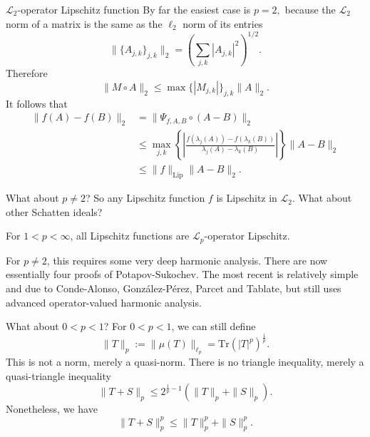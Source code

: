 \documentclass{beamer}
\numberwithin{equation}{section}
\theoremstyle{plain}
\theoremstyle{plain}
\theoremstyle{definition}
\theoremstyle{plain}
\theoremstyle{plain}
\theoremstyle{definition}
\newcommand{\Lc}{\mathcal{L}}
\newcommand{\Tr}{\mathrm{Tr}}
\begin{document}
\begin{frame}{$\Lc_2$-operator Lipschitz function}
    By far the easiest case is $p=2,$ because the $\Lc_2$ norm of a matrix is the same as the $\ell_2$ norm of its entries
    \[
        \|\{A_{j,k}\}_{j,k}\|_2 = \left(\sum_{j,k} |A_{j,k}|^2\right)^{1/2}.
    \]
    Therefore
    \[
        \|M\circ A\|_{2} \leq \max\{|M_{j,k}|\}_{j,k} \|A\|_2.
    \]
    It follows that
    \begin{align*}
        \|f(A)-f(B)\|_2 &= \|\Psi_{f,A,B}\circ (A-B)\|_2\\
                        &\leq \max_{j,k} \left\{\left|\frac{f(\lambda_j(A))-f(\lambda_k(B))}{\lambda_j(A)-\lambda_k(B)}\right|\right\}\|A-B\|_2\\
                        &\leq\|f\|_{\mathrm{Lip}}\|A-B\|_2.
    \end{align*}
\end{frame}



\begin{frame}{What about $p\neq 2$?}
    So any Lipschitz function $f$ is Lipschitz in $\Lc_2.$ What about other Schatten ideals?
    \begin{theorem}
        For $1 < p < \infty$, all Lipschitz functions are $\Lc_p$-operator Lipschitz.
    \end{theorem}
    \pause
    For $p\neq 2$, this requires some very deep harmonic analysis. \pause
    There are now essentially four proofs of Potapov-Sukochev. The most recent is relatively simple and due to
    Conde-Alonso, Gonz\'alez-P\'erez, Parcet and Tablate, but still uses advanced operator-valued harmonic analysis.
\end{frame}



\begin{frame}{What about $0 < p < 1$?}
    For $0 < p < 1$, we can still define
    $$
        \|T\|_p := \|\mu(T)\|_{\ell_p} = \Tr(|T|^p)^{\frac1p}.
    $$
    This is not a norm, merely a quasi-norm. There is no triangle inequality, merely a quasi-triangle inequality
    $$
        \|T+S\|_p \leq 2^{\frac1p-1}(\|T\|_p+\|S\|_p).
    $$
    \pause
    Nonetheless, we have
    \[
        \|T+S\|_p^p \leq \|T\|_p^p+\|S\|_p^p.
    \]
\end{frame}

%
%
%
\end{document}

